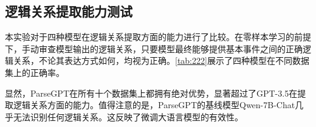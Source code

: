 \subsection{逻辑关系提取能力测试}

本实验对于四种模型在逻辑关系提取方面的能力进行了比较。在零样本学习的前提下，手动审查模型输出的逻辑关系，只要模型最终能够提供基本事件之间的正确逻辑关系，不论其表达方式如何，均视为正确。\autoref{tab:222}展示了四种模型在不同数据集上的正确率。

显然，ParseGPT在所有十个数据集上都拥有绝对优势，显著超过了GPT-3.5在提取逻辑关系方面的能力。值得注意的是，ParseGPT的基线模型Qwen-7B-Chat几乎无法识别任何逻辑关系。这反映了微调大语言模型的有效性。

